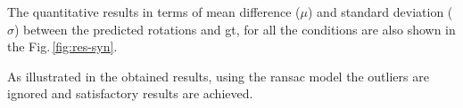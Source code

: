 The quantitative results in terms of mean difference ($\mu$) and standard
deviation ($\sigma$) between the predicted rotations and \gls{gt}, for all the
conditions are also shown in the Fig.\,\ref{fig:res-syn}.




As illustrated in the obtained results, using the \gls{ransac}
model the outliers are ignored and satisfactory results are achieved.

